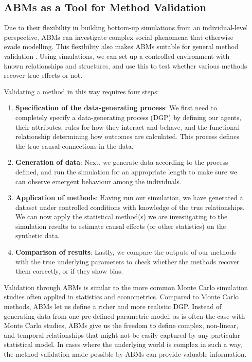 \subsection{ABMs as a Tool for Method Validation}

Due to their flexibility in building bottom-up simulations from an individual-level perspective, ABMs can investigate complex social phenomena that otherwise evade modelling. This flexibility also makes ABMs suitable for general method validation \parencite{DazaKreuger2021}. Using simulations, we can set up a controlled environment with known relationships and structures, and use this to test whether various methods recover true effects or not.

Validating a method in this way requires four steps:

\begin{enumerate}
    \item \textbf{Specification of the data-generating process}: We first need to completely specify a data-generating process (DGP) by defining our agents, their attributes, rules for how they interact and behave, and the functional relationship determining how outcomes are calculated. This process defines the true causal connections in the data.
    \item \textbf{Generation of data}: Next, we generate data according to the process defined, and run the simulation for an appropriate length to make sure we can observe emergent behaviour among the individuals.
    \item \textbf{Application of methods}: Having run our simulation, we have generated a dataset under controlled conditions with knowledge of the true relationships. We can now apply the statistical method(s) we are investigating to the simulation results to estimate causal effects (or other statistics) on the synthetic data.
    \item \textbf{Comparison of results}: Lastly, we compare the outputs of our methods with the true underlying parameters to check whether the methods recover them correctly, or if they show bias.
\end{enumerate}

Validation through ABMs is similar to the more common Monte Carlo simulation studies often applied in statistics and econometrics. Compared to Monte Carlo methods, ABMs let us define a richer and more realistic DGP\@. Instead of generating data from one pre-defined parametric model, as is often the case with Monte Carlo studies, ABMs give us the freedom to define complex, non-linear, and temporal relationships that might not be easily captured by any particular statistical model. In cases where the underlying world is complex in such a way, the method validation made possible by ABMs can provide valuable information.

